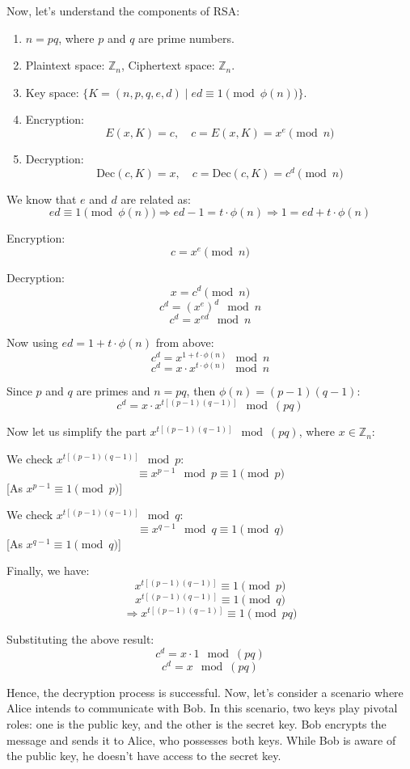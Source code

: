 \documentclass[11pt]{article}
\begin{document}
Now, let's understand the components of RSA:
\begin{enumerate}
    \item $n = pq$, where $p$ and $q$ are prime numbers.
    \item Plaintext space: $\mathbb{Z}_n$, Ciphertext space: $\mathbb{Z}_n$.
    \item Key space: $\{ K = (n,p,q,e,d) \mid ed \equiv 1 \pmod{\phi(n)} \}$.
    \item Encryption:
    \[ E(x, K) = c, \quad c = E(x, K) = x^e \pmod{n} \]
    \item Decryption:
    \[ \text{Dec}(c, K) = x, \quad c = \text{Dec}(c, K) = c^d \pmod{n} \]
\end{enumerate}

We know that $e$ and $d$ are related as:
\[ ed \equiv 1 \pmod{\phi(n)} \Rightarrow ed - 1 = t\cdot\phi(n) \Rightarrow 1 = ed + t\cdot\phi(n) \]

Encryption:
\[ c = x^e \pmod{n} \]

Decryption:
\[ x = c^d \pmod{n} \]
\[ c^d = (x^e)^d \mod n \]
\[ c^d = x^{ed} \mod n \]

Now using $ed = 1 + t\cdot\phi(n)$ from above:
\[ c^d = x^{1 + t\cdot\phi(n)} \mod n \]
\[ c^d = x \cdot x^{t\cdot\phi(n)} \mod n \]

Since $p$ and $q$ are primes and $n = pq$, then $\phi(n) = (p-1)(q-1)$:
\[ c^d = x \cdot x^{t[(p-1)(q-1)]} \mod (pq) \]

Now let us simplify the part $x^{t[(p-1)(q-1)]} \mod (pq)$, where $x \in \mathbb{Z}_n$:

We check $x^{t[(p-1)(q-1)]} \mod p$:
\[ \equiv x^{p-1} \mod p \equiv 1 \pmod p \] [As $x^{p-1} \equiv 1 \pmod p$]

We check $x^{t[(p-1)(q-1)]} \mod q$:
\[ \equiv x^{q-1} \mod q \equiv 1 \pmod q \] [As $x^{q-1} \equiv 1 \pmod q$]

Finally, we have:
\[ x^{t[(p-1)(q-1)]} \equiv 1 \pmod p \]
\[ x^{t[(p-1)(q-1)]} \equiv 1 \pmod q \]
\[ \Rightarrow x^{t[(p-1)(q-1)]} \equiv 1 \pmod {pq} \]

Substituting the above result:
\[ c^d = x \cdot 1 \mod (pq) \]
\[ c^d = x \mod (pq) \]

Hence, the decryption process is successful. Now, let's consider a scenario where Alice intends to communicate with Bob. In this scenario, two keys play pivotal roles: one is the public key, and the other is the secret key. Bob encrypts the message and sends it to Alice, who possesses both keys. While Bob is aware of the public key, he doesn't have access to the secret key.
\end{document}
